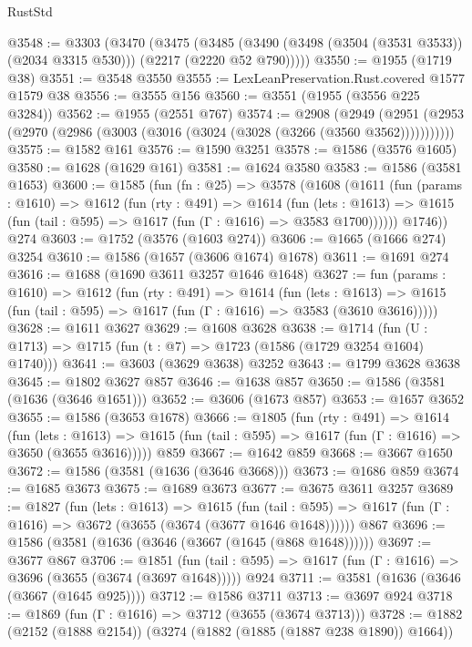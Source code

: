 \begin{lexlean}{RustStd}
\begin{coremodule}
@3548 := @3303
    (@3470
      (@3475
        (@3485 (@3490 (@3498 (@3504 (@3531 @3533)) (@2034 @3315 @530))) (@2217 (@2220 @52 @790)))))
@3550 := @1955 (@1719 @38)
@3551 := @3548 @3550
@3555 := LexLeanPreservation.Rust.covered @1577 @1579 @38
@3556 := @3555 @156
@3560 := @3551 (@1955 (@3556 @225 @3284))
@3562 := @1955 (@2551 @767)
@3574 := @2908
    (@2949 (@2951 (@2953 (@2970 (@2986 (@3003 (@3016 (@3024 (@3028 (@3266 (@3560 @3562)))))))))))
@3575 := @1582 @161
@3576 := @1590 @3251
@3578 := @1586 (@3576 @1605)
@3580 := @1628 (@1629 @161)
@3581 := @1624 @3580
@3583 := @1586 (@3581 @1653)
@3600 := @1585
    (fun (fn : @25) =>
    @3578
      (@1608
        (@1611
          (fun (params : @1610) =>
          @1612
            (fun (rty : @491) =>
            @1614
              (fun (lets : @1613) =>
              @1615 (fun (tail : @595) => @1617 (fun (Γ : @1616) => @3583 @1700))))))
        @1746))
    @274
@3603 := @1752 (@3576 (@1603 @274))
@3606 := @1665 (@1666 @274) @3254
@3610 := @1586 (@1657 (@3606 @1674) @1678)
@3611 := @1691 @274
@3616 := @1688 (@1690 @3611 @3257 @1646 @1648)
@3627 := fun (params : @1610) =>
  @1612
    (fun (rty : @491) =>
    @1614
      (fun (lets : @1613) =>
      @1615 (fun (tail : @595) => @1617 (fun (Γ : @1616) => @3583 (@3610 @3616)))))
@3628 := @1611 @3627
@3629 := @1608 @3628
@3638 := @1714 (fun (U : @1713) => @1715 (fun (t : @7) => @1723 (@1586 (@1729 @3254 @1604) @1740)))
@3641 := @3603 (@3629 @3638) @3252
@3643 := @1799 @3628 @3638
@3645 := @1802 @3627 @857
@3646 := @1638 @857
@3650 := @1586 (@3581 (@1636 (@3646 @1651)))
@3652 := @3606 (@1673 @857)
@3653 := @1657 @3652
@3655 := @1586 (@3653 @1678)
@3666 := @1805
    (fun (rty : @491) =>
    @1614
      (fun (lets : @1613) =>
      @1615 (fun (tail : @595) => @1617 (fun (Γ : @1616) => @3650 (@3655 @3616)))))
    @859
@3667 := @1642 @859
@3668 := @3667 @1650
@3672 := @1586 (@3581 (@1636 (@3646 @3668)))
@3673 := @1686 @859
@3674 := @1685 @3673
@3675 := @1689 @3673
@3677 := @3675 @3611 @3257
@3689 := @1827
    (fun (lets : @1613) =>
    @1615
      (fun (tail : @595) => @1617 (fun (Γ : @1616) => @3672 (@3655 (@3674 (@3677 @1646 @1648))))))
    @867
@3696 := @1586 (@3581 (@1636 (@3646 (@3667 (@1645 (@868 @1648))))))
@3697 := @3677 @867
@3706 := @1851
    (fun (tail : @595) => @1617 (fun (Γ : @1616) => @3696 (@3655 (@3674 (@3697 @1648)))))
    @924
@3711 := @3581 (@1636 (@3646 (@3667 (@1645 @925))))
@3712 := @1586 @3711
@3713 := @3697 @924
@3718 := @1869 (fun (Γ : @1616) => @3712 (@3655 (@3674 @3713)))
@3728 := @1882 (@2152 (@1888 @2154)) (@3274 (@1882 (@1885 (@1887 @238 @1890)) @1664))

\end{coremodule}
\end{lexlean}
